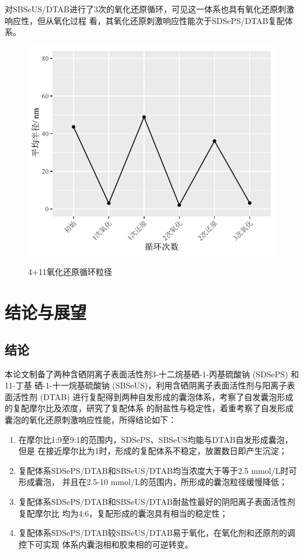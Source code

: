 \documentclass[bachelor,winfonts,replaceperiod]{jnuthesis}
\begin{document}
    对SBSeUS/DTAB进行了3次的氧化还原循环，可见这一体系也具有氧化还原刺激响应性，但从氧化过程
    看，其氧化还原刺激响应性能次于SDSePS/DTAB复配体系。
    \begin{figure}[htbp]
        \centering
        \includegraphics[width=.6\textwidth]{figure/SBSeUS-redox-circle}\\
        \caption{4+11氧化还原循环粒径}\label{fig:SBSeUS-redox-circle}
    \end{figure}
    
    \chapter{结论与展望}\label{chapter:concludes}
    \section{结论}
    本论文制备了两种含硒阴离子表面活性剂3-十二烷基硒-1-丙基硫酸钠 (SDSePS) 和11-丁基
    硒-1-十一烷基硫酸钠 (SBSeUS)，利用含硒阴离子表面活性剂与阳离子表面活性剂 (DTAB)
    进行复配得到两种自发形成的囊泡体系，考察了自发囊泡形成的复配摩尔比及浓度，研究了复配体系
    的耐盐性与稳定性，着重考察了自发形成囊泡的氧化还原刺激响应性能，所得结论如下：
    \begin{enumerate}
        \item 在摩尔比1:9至9:1的范围内，SDSePS、SBSeUS均能与DTAB自发形成囊泡，但是
        在接近摩尔比为1时，形成的复配体系不稳定，放置数日即产生沉淀；
        \item 复配体系SDSePS/DTAB和SBSeUS/DTAB均当浓度大于等于2.5 mmol/L时可形成囊泡，
        并且在2.5-10 mmol/L的范围内，所形成的囊泡粒径缓慢降低；
        \item 复配体系SDSePS/DTAB和SBSeUS/DTAB耐盐性最好的阴阳离子表面活性剂复配摩尔比
        均为4:6，复配形成的囊泡具有相当的稳定性；
        \item 复配体系SDSePS/DTAB较SBSeUS/DTAB易于氧化，在氧化剂和还原剂的调控下可实现
        体系内囊泡相和胶束相的可逆转变。
    \end{enumerate}
        
\end{document}
